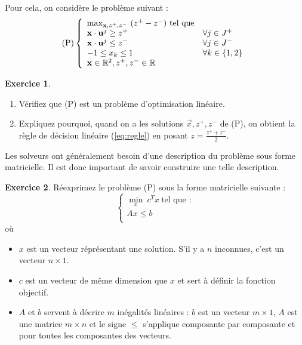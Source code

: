 \documentclass[a4paper,francais]{article}
\newcommand{\R}{{\ensuremath\mathbb{R}}}
\theoremstyle{definition}
\newtheorem{exercice}{Exercice}[section]
\begin{document}
Pour cela, on considère le problème suivant :
\[
\text{(P)}
\left\{
\begin{array}{ll}
  \max_{\vec{x},z^+,z^-} \ (z^+ - z^-) \ \text{tel que} & \\
  \vec{x} \cdot \vec{u}^j \geq z^+ & \forall j \in J^+ \\ 
  \vec{x} \cdot \vec{u}^j \leq z^- & \forall j \in J^- \\
  -1 \leq x_k \leq 1 & \forall k \in \{1, 2\} \\
  \vec{x} \in \R^2, z^+, z^- \in \R \\
\end{array}
\right.
\]

\begin{exercice}

  \begin{enumerate}
  \item Vérifiez que (P) est un problème d'optimisation linéaire.
  \item Expliquez pourquoi, quand on a les solutions $\vec{x}, z^+, z^-$
    de (P), on obtient la règle de décision linéaire (\ref{eq:regle})
    en posant $z = \frac{z^+ + z^-}{2}$.  
  \end{enumerate}

\end{exercice}

Les solveurs ont généralement besoin d'une description du problème
sous forme matricielle. Il est donc important de savoir construire
une telle description.

\begin{exercice}
  Réexprimez le problème (P)
  sous la forme matricielle suivante :
  \[
  \left\{
  \begin{array}{c}
    \min_x \ c^T x \ \text{tel que :} \\
    Ax \leq b \\
  \end{array}
  \right. 
  \]
  où 
\begin{itemize}
\item $x$ est un vecteur réprésentant une solution. S'il y a $n$ inconnues, c'est un vecteur $n \times 1$.
\item $c$ est un vecteur de même dimension que $x$ et sert à définir la fonction objectif.
\item $A$ et $b$ servent à décrire $m$ inégalités linéaires : $b$ est un vecteur $m \times 1$,
  $A$ est une matrice $m \times n$ et le signe $\leq$ s'applique composante par composante et pour
  toutes les composantes des vecteurs.
\end{itemize}
\end{exercice}
\end{document}
